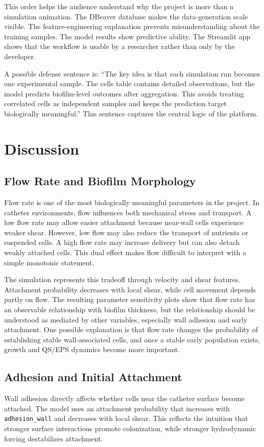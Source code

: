 \documentclass[12pt,a4paper,oneside]{report}
\begin{document}
This order helps the audience understand why the project is more than a simulation animation. The DBeaver database makes the data-generation scale visible. The feature-engineering explanation prevents misunderstanding about the training samples. The model results show predictive ability. The Streamlit app shows that the workflow is usable by a researcher rather than only by the developer.

A possible defense sentence is: ``The key idea is that each simulation run becomes one experimental sample. The cells table contains detailed observations, but the model predicts biofilm-level outcomes after aggregation. This avoids treating correlated cells as independent samples and keeps the prediction target biologically meaningful.'' This sentence captures the central logic of the platform.

\chapter{Discussion}

\section{Flow Rate and Biofilm Morphology}
Flow rate is one of the most biologically meaningful parameters in the project. In catheter environments, flow influences both mechanical stress and transport. A low flow rate may allow easier attachment because near-wall cells experience weaker shear. However, low flow may also reduce the transport of nutrients or suspended cells. A high flow rate may increase delivery but can also detach weakly attached cells. This dual effect makes flow difficult to interpret with a simple monotonic statement.

The simulation represents this tradeoff through velocity and shear features. Attachment probability decreases with local shear, while cell movement depends partly on flow. The resulting parameter sensitivity plots show that flow rate has an observable relationship with biofilm thickness, but the relationship should be understood as mediated by other variables, especially wall adhesion and early attachment. One possible explanation is that flow rate changes the probability of establishing stable wall-associated cells, and once a stable early population exists, growth and QS/EPS dynamics become more important.

\section{Adhesion and Initial Attachment}
Wall adhesion directly affects whether cells near the catheter surface become attached. The model uses an attachment probability that increases with \texttt{adhesion\_wall} and decreases with local shear. This reflects the intuition that stronger surface interactions promote colonization, while stronger hydrodynamic forcing destabilizes attachment.
\end{document}
